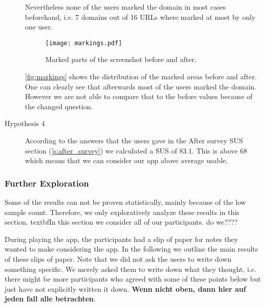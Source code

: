 \begin{description}
Nevertheless none of the users marked the domain in most cases beforehand, i.e. 7 domains out of 16 URLs where marked at most by only one user.
\begin{figure}
\centering
\texttt{[image: markings.pdf]}
\caption{Marked parts of the screenshot before and after.}
\label{fig:markings}
\end{figure}
\autoref{fig:markings} shows the distribution of the marked areas before and after. One can clearly see that afterwards most of the users marked the domain. However we are not able to compare that to the before values because of the changed question.
\item[Hypothesis 4]
According to the answers that the users gave in the After survey SUS section (\autoref{s:after_survey}) we calculated a SUS of 83.1. This is above 68 which means that we can consider our app above average usable.
\end{description}
\subsubsection{Further Exploration}
Some of the results can not be proven statistically, mainly because of the low sample count. 
Therefore, we only exploratively analyze these results in this section.
textbf{In this section we consider all of our participants. do we????} 

\begin{description}[leftmargin=0cm]
	\item[text]
\end{description}


During playing the app, the participants had a slip of paper for notes they wanted to make considering the app.
In the following we outline the main results of these slips of paper.
Note that we did not ask the users to write down something specific. 
We merely asked them to write down what they thought, i.e. there might be more participants who agreed with some of these points below but just have not explicitly written it down.
\textbf{Wenn nicht oben, dann hier auf jeden fall alle betrachten}.

